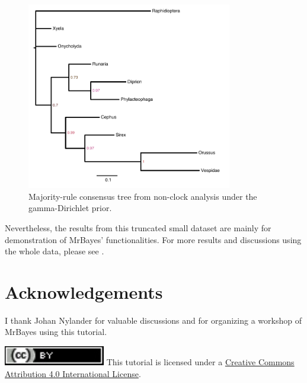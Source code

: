 \documentclass[12pt]{article}
\begin{document}
\begin{figure}[p]
\includegraphics[width=0.8\textwidth]{figures/nctree.pdf}
\caption{Majority-rule consensus tree from non-clock analysis under the gamma-Dirichlet prior.}
\label{fig_nctree}
\end{figure}

Nevertheless, the results from this truncated small dataset are mainly for demonstration of MrBayes' functionalities.
For more results and discussions using the whole data, please see \citet{Ronquist:2012ea,Zhang:2016kf}.


\section{Acknowledgements}

I thank Johan Nylander for valuable discussions and for organizing a workshop of MrBayes using this tutorial. 

\bigskip
\noindent \href{http://creativecommons.org/licenses/by/4.0/}{\includegraphics[scale=0.8]{figures/ccby.pdf}} This tutorial is licensed under a \href{http://creativecommons.org/licenses/by/4.0/}{Creative Commons Attribution 4.0 International License}. 

\newpage


\end{document}
